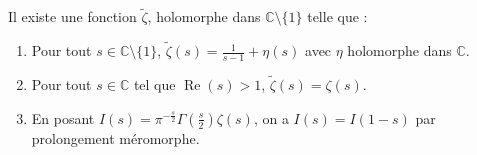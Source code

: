   \begin{theorem}
    Il existe une fonction $\widetilde{\zeta}$, holomorphe dans $\mathbb{C} \setminus \{ 1 \}$ telle que :
    \begin{enumerate}[label={\bfseries(\roman*)}]
      \item Pour tout $s \in \mathbb{C} \setminus \{ 1 \}$, $\widetilde{\zeta}(s) = \frac{1}{s-1} + \eta(s)$ avec $\eta$ holomorphe dans $\mathbb{C}$.
      \item Pour tout $s \in \mathbb{C}$ tel que $\operatorname{Re}(s) > 1$, $\widetilde{\zeta}(s) = \zeta(s)$.
      \item En posant $I(s) = \pi^{-\frac{s}{2}} \Gamma \left( \frac{s}{2} \right) \zeta(s)$, on a $I(s) = I(1-s)$ par prolongement méromorphe.
    \end{enumerate}
  \end{theorem}

